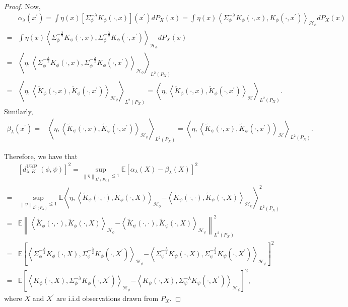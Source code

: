 \documentclass[11pt]{article}
\newcommand{\E}{\mathbb{E}}
\newcommand{\Hil}{\mathcal{H}}
\newcommand{\repone}{\phi}
\newcommand{\reptwo}{\psi}
\newcommand{\Hone}{\mathcal{H}_{\phi}}
\newcommand{\Htwo}{\mathcal{H}_{\psi}}
\newcommand{\norm}[1]{\left\|#1\right\|}
\newcommand{\inprod}[1]{\left \langle #1 \right\rangle}
\newcommand{\LPtwo}{L^{2}(P_{X})}
\newcommand{\metricstname}{UKP }
\theoremstyle{plain}
\begin{document}
\begin{proof}
Now, 
\[
\begin{aligned}
    &\alpha_{\lambda}(x^{\prime}) = \int \eta(x) \left[\Sigma_{\repone}^{-\lambda}K_{\repone}(\cdot,x)\right](x^{\prime})dP_{X}(x)
    = \int \eta(x) \inprod{\Sigma_{\repone}^{-\lambda}K_{\repone}(\cdot,x),K_{\repone}(\cdot,x^{\prime})}_{\Hone}dP_{X}(x)\\
    = &\int \eta(x) \inprod{\Sigma_{\repone}^{-\frac{\lambda}{2}}K_{\repone}(\cdot,x),\Sigma_{\repone}^{-\frac{\lambda}{2}}K_{\repone}(\cdot,x^{\prime})}_{\Hone}dP_{X}(x)\\
    = & \inprod{\eta,\inprod{\Sigma_{\repone}^{-\frac{\lambda}{2}}K_{\repone}(\cdot,x),\Sigma_{\repone}^{-\frac{\lambda}{2}}K_{\repone}(\cdot,x^{\prime})}_{\Hone}}_{\LPtwo}\\
    = & \inprod{\eta,\inprod{\widetilde{K}_{\repone}(\cdot,x),\widetilde{K}_{\repone}(\cdot,x^{\prime})}_{\Hone}}_{\LPtwo}
     = \inprod{\eta,\inprod{\widetilde{K}_{\repone}(\cdot,x),\widetilde{K}_{\repone}(\cdot,x^{\prime})}_{\Hil}}_{\LPtwo}.
\end{aligned}
\]
Similarly,
\[
\begin{aligned}
    \beta_{\lambda}(x^{\prime}) = & \inprod{\eta,\inprod{\widetilde{K}_{\reptwo}(\cdot,x),\widetilde{K}_{\reptwo}(\cdot,x^{\prime})}_{\Htwo}}_{\LPtwo}
     =  \inprod{\eta,\inprod{\widetilde{K}_{\reptwo}(\cdot,x),\widetilde{K}_{\reptwo}(\cdot,x^{\prime})}_{\Hil}}_{\LPtwo}.
\end{aligned}
\]

Therefore, we have that
\[
\begin{aligned}
&\left[d_{\lambda,K}^{\text{\metricstname}}(\repone,\reptwo)\right]^{2}
    = \underset{\norm{\eta}_{\LPtwo} \leq 1}{\sup} \E\left[\alpha_{\lambda}(X)-\beta_{\lambda}(X)\right]^{2}\\
    =& \underset{\norm{\eta}_{\LPtwo} \leq 1}{\sup} \E\left\langle\eta, \inprod{\widetilde{K}_{\repone}(\cdot,\cdot),\widetilde{K}_{\repone}(\cdot,X)}_{\Hone} \right.\left.-\inprod{\widetilde{K}_{\reptwo}(\cdot,\cdot),\widetilde{K}_{\reptwo}(\cdot,X)}_{\Htwo}\right\rangle_{\LPtwo}^{2}
    \end{aligned}
    \]
    \[
    \begin{aligned}
    =& \E \left\|\inprod{\widetilde{K}_{\repone}(\cdot,\cdot),\widetilde{K}_{\repone}(\cdot,X)}_{\Hone} \right.\left.-\inprod{\widetilde{K}_{\reptwo}(\cdot,\cdot),\widetilde{K}_{\reptwo}(\cdot,X)}_{\Htwo}\right\|_{\LPtwo}^{2}\\
    =& \E  \left[\inprod{\Sigma_{\repone}^{-\frac{\lambda}{2}}K_{\repone}(\cdot,X),\Sigma_{\repone}^{-\frac{\lambda}{2}}K_{\repone}(\cdot,X^{\prime})}_{\Hone} \right.  \left.-\inprod{\Sigma_{\reptwo}^{-\frac{\lambda}{2}}K_{\reptwo}(\cdot,X),\Sigma_{\reptwo}^{-\frac{\lambda}{2}}K_{\reptwo}(\cdot,X^{\prime})}_{\Htwo}\right]^{2}\\
   = & \E  \left[\inprod{K_{\repone}(\cdot,X),\Sigma_{\repone}^{-\lambda}K_{\repone}(\cdot,X^{\prime})}_{\Hone} \right.  \left.-\inprod{K_{\reptwo}(\cdot,X),\Sigma_{\reptwo}^{-\lambda}K_{\reptwo}(\cdot,X^{\prime})}_{\Htwo}\right]^{2},
\end{aligned}
\]
where $X$ and $X^{\prime}$ are i.i.d observations drawn from $P_{X}$.
\end{proof}
\end{document}
